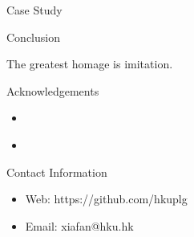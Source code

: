 \documentclass[final]{beamer}
\newlength{\onecolwid}
\begin{document}
\begin{frame}[t]
\begin{columns}[t]
\begin{column}{\onecolwid}
\begin{block}{Case Study}
\begin{figure}
\end{figure}



\end{block}



\begin{block}{Conclusion}

 The greatest homage is imitation.


\end{block}





\begin{block}{Acknowledgements}
\begin{itemize}
\item \small{}
\item \small{} \\
\end{itemize}
\end{block}



\begin{alertblock}{Contact Information}

\begin{itemize}
\item Web: https://github.com/hkuplg
\item Email: xiafan@hku.hk
\end{itemize}


\end{alertblock}
\end{column}
\end{columns}
\end{frame}
\end{document}

